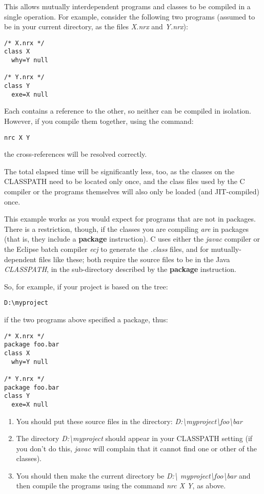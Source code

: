 This allows mutually interdependent programs and classes to be compiled
in a single operation.  For example, consider the following two programs
(assumed to be in your current directory, as the files \emph{X.nrx}
and \emph{Y.nrx}):
\begin{lstlisting}[label=dependencies,caption=Dependencies]
/* X.nrx */
class X
  why=Y null

/* Y.nrx */
class Y
  exe=X null
\end{lstlisting}
Each contains a reference to the other, so neither can be compiled in
isolation.  However, if you compile them together, using the command:
\begin{lstlisting}
nrc X Y
\end{lstlisting}
 the cross-references will be resolved correctly.

The total elapsed time will be significantly less, too, as the classes
on the CLASSPATH need to be located only once, and the class files used
by the \nr{}C compiler or the programs themselves will also only be
loaded (and JIT-compiled) once.

This example works as you would expect for programs that are not in
packages.  There is a restriction, though, if the classes you are
compiling \emph{are} in packages (that is, they include a
\textbf{package} instruction).  \nr{}C uses either the \emph{javac}
compiler or the Eclipse batch compiler \emph{ecj} to generate the \emph{.class} files, and for mutually-dependent
files like these; both require the source files to be in the
Java \emph{CLASSPATH}, in the sub-directory described by the \textbf{package}
instruction.


So, for example, if your project is based on the tree:

\texttt{D:\textbackslash myproject}

 if the two programs above specified a package, thus:
\begin{lstlisting}[label=packagedep,caption=Package Dependencies]
/* X.nrx */
package foo.bar
class X
  why=Y null

/* Y.nrx */
package foo.bar
class Y
  exe=X null
\end{lstlisting}


\begin{enumerate}
\item
You should put these source files in the directory:
\emph{D:\textbackslash myproject\textbackslash foo\textbackslash bar}
\item
The directory \emph{D:\textbackslash myproject} should appear in your CLASSPATH
setting (if you don't do this, \emph{javac} will complain that it cannot
find one or other of the classes).
\item
You should then make the current directory be \emph{D:\textbackslash
myproject\textbackslash foo\textbackslash bar}
and then compile the programs using the command \emph{nrc X Y},
as above.
\end{enumerate}

